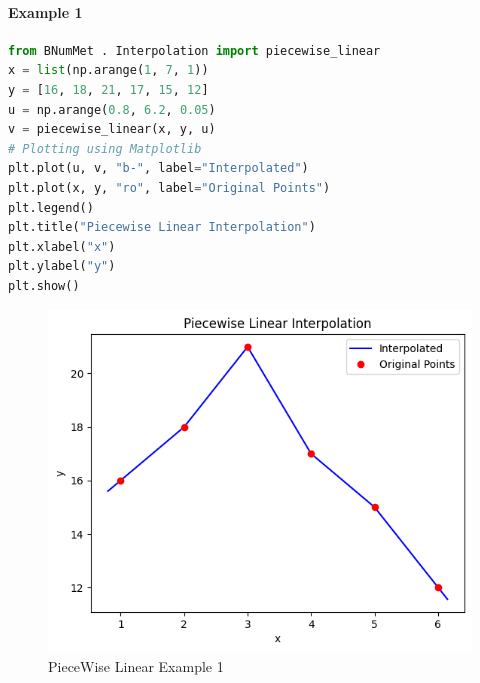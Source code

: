 \paragraph{Example 1}{
\begin{lstlisting}[language=Python]
from BNumMet . Interpolation import piecewise_linear
x = list(np.arange(1, 7, 1))
y = [16, 18, 21, 17, 15, 12]
u = np.arange(0.8, 6.2, 0.05)
v = piecewise_linear(x, y, u)
# Plotting using Matplotlib
plt.plot(u, v, "b-", label="Interpolated")
plt.plot(x, y, "ro", label="Original Points")
plt.legend()
plt.title("Piecewise Linear Interpolation")
plt.xlabel("x")
plt.ylabel("y")
plt.show()
\end{lstlisting}
\begin{figure}[H]
    \centering
    \includegraphics{Include/Images/Thesis/Documentation/Interpolation/PieceWise Linear Example 1.png}
    \caption{PieceWise Linear Example 1}
    \label{fig:PieceWise Linear Example 1}
\end{figure}
}